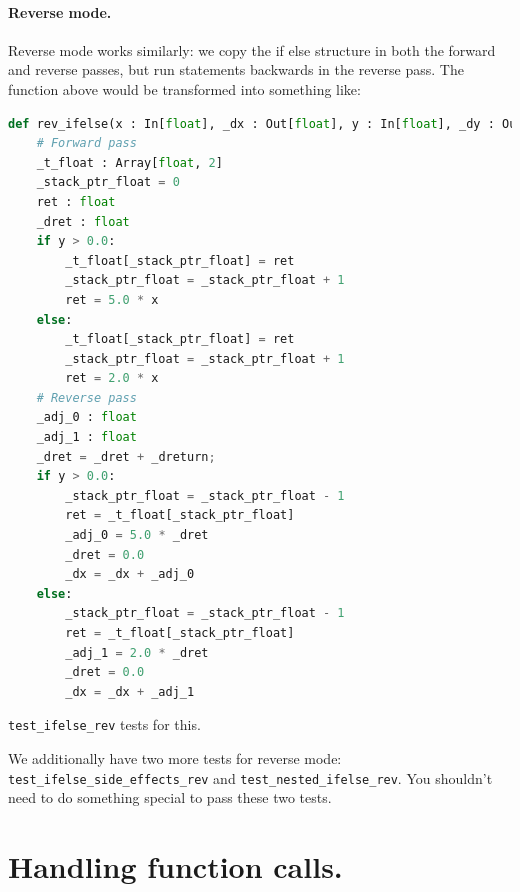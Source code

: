 \paragraph{Reverse mode.} Reverse mode works similarly: we copy the if else structure in both the forward and reverse passes, but run statements backwards in the reverse pass. The function above would be transformed into something like:
\begin{lstlisting}[language=Python]
def rev_ifelse(x : In[float], _dx : Out[float], y : In[float], _dy : Out[float], _dreturn : In[float]):
    # Forward pass
    _t_float : Array[float, 2]
    _stack_ptr_float = 0
    ret : float
    _dret : float
    if y > 0.0:
        _t_float[_stack_ptr_float] = ret
        _stack_ptr_float = _stack_ptr_float + 1
        ret = 5.0 * x
    else:
        _t_float[_stack_ptr_float] = ret
        _stack_ptr_float = _stack_ptr_float + 1
        ret = 2.0 * x
    # Reverse pass
    _adj_0 : float
    _adj_1 : float
    _dret = _dret + _dreturn;
    if y > 0.0:
        _stack_ptr_float = _stack_ptr_float - 1
        ret = _t_float[_stack_ptr_float]
        _adj_0 = 5.0 * _dret
        _dret = 0.0
        _dx = _dx + _adj_0
    else:
        _stack_ptr_float = _stack_ptr_float - 1
        ret = _t_float[_stack_ptr_float]
        _adj_1 = 2.0 * _dret
        _dret = 0.0
        _dx = _dx + _adj_1
\end{lstlisting}

\lstinline{test_ifelse_rev} tests for this.

We additionally have two more tests for reverse mode: \lstinline{test_ifelse_side_effects_rev} and \lstinline{test_nested_ifelse_rev}. You shouldn't need to do something special to pass these two tests.

\section{Handling function calls.}

